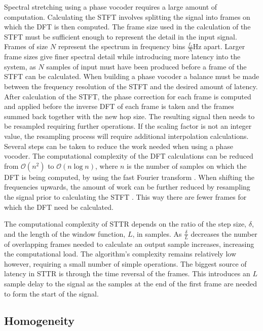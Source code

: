 		Spectral stretching using a phase vocoder requires a large amount of computation. Calculating the STFT
		involves splitting the signal into frames on which the DFT is then computed. The frame size used in the
		calculation of the STFT must be sufficient enough to represent the detail in the input signal. Frames of
		size $N$ represent the spectrum in frequency bins $\frac{f_{s}}{N}$Hz apart. Larger frame sizes give finer
		spectral detail while introducing more latency into the system, as $N$ samples of input must have been
		produced before a frame of the STFT can be calculated. When building a phase vocoder a balance must be made
		between the frequency resolution of the STFT and the desired amount of latency. After calculation of the
		STFT, the phase correction for each frame is computed and applied before the inverse DFT of each frame is
		taken and the frames summed back together with the new hop size. The resulting signal then needs to be
		resampled requiring further operations. If the scaling factor is not an integer value, the resampling
		process will require additional interpolation calculations. Several steps can be taken to reduce the work
		needed when using a phase vocoder. The computational complexity of the DFT calculations can be reduced from
		$\mathcal{O} \left( n^{2} \right)$ to $\mathcal{O}(n\log{n})$, where $n$ is the number of samples on which
		the DFT is being computed, by using the fast Fourier transform \citep{portnoff1976implementation}. When
		shifting the frequencies upwards, the amount of work can be further reduced by resampling the signal prior
		to calculating the STFT \citep{laroche1999new}. This way there are fewer frames for which the DFT need be
		calculated.

		The computational complexity of STTR depends on the ratio of the step size, $\delta$, and the length of the
		window function, $L$, in samples. As $\frac{\delta}{L}$ decreases the number of overlapping frames needed
		to calculate an output sample increases, increasing the computational load. The algorithm's complexity
		remains relatively low however, requiring a small number of simple operations. The biggest source of
		latency in STTR is through the time reversal of the frames. This introduces an $L$ sample delay to the
		signal as the samples at the end of the first frame are needed to form the start of the signal.

	\subsection{Homogeneity}
	\label{sec:ExcitationEvaluation-Comparison-Homogeneity}
